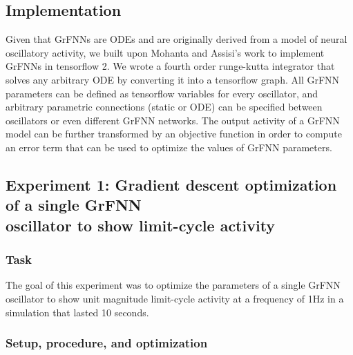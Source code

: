 \documentclass{report}
\begin{document}
\subsection{Implementation}

Given that GrFNNs are ODEs and are originally derived from a model of neural oscillatory activity, we built upon Mohanta and Assisi's work \cite{mohanta2019parallel} to implement GrFNNs in tensorflow 2. We wrote a fourth order runge-kutta integrator that solves any arbitrary ODE by converting it into a tensorflow graph. All GrFNN parameters can be defined as tensorflow variables for every oscillator, and arbitrary parametric connections (static or ODE) can be specified between oscillators or even different GrFNN networks. The output activity of a GrFNN model can be further transformed by an objective function in order to compute an error term that can be used to optimize the values of GrFNN parameters. 

\subsection{Experiment 1: Gradient descent optimization of a single GrFNN \\ oscillator to show limit-cycle activity} 

\subsubsection{Task}

The goal of this experiment was to optimize the parameters of a single GrFNN oscillator to show unit magnitude limit-cycle activity at a frequency of 1Hz in a simulation that lasted 10 seconds. 

\subsubsection{Setup, procedure, and optimization}
\end{document}
